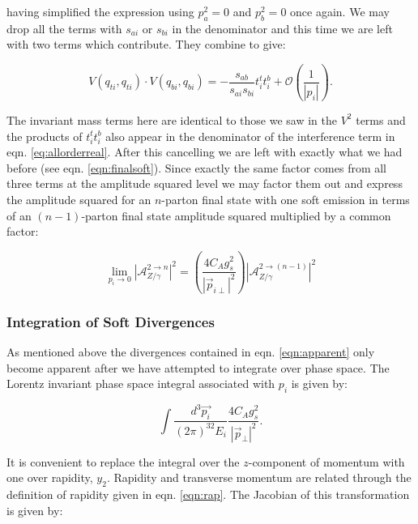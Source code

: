 			having simplified the expression using $p_a^2=0$ and $p_b^2=0$ once again.  We may
			drop all the terms with $s_{ai}$ or $s_{bi}$ in the denominator and this time we are
			left with two terms which contribute.  They combine to give:

			\begin{equation}
				V(q_{ti}, q_{ti})\cdot V(q_{bi}, q_{bi}) = -\frac{s_{ab}}{s_{ai}s_{bi}}t_i^tt_i^b +
					\mathcal{O}\left(\frac{1}{|p_i|}\right).
			\end{equation}

			The invariant mass terms here are identical to those we saw in the $V^2$ terms and the products of
			$t_i^tt_i^b$ also appear in the denominator of the interference term in eqn. \eqref{eq:allorderreal}.
			After this cancelling we are left with exactly what we had before (see eqn. \eqref{eqn:finalsoft}).
			Since exactly the same factor comes from all three terms at the amplitude squared level we may factor
			them out and express the amplitude squared for an $n$-parton final state with one soft emission in
			terms of an $(n-1)$-parton final state amplitude squared multiplied by a common factor:

			\begin{equation}
				\lim_{p_i\rightarrow0} |\mathcal{A}_{Z/\gamma}^{2\rightarrow n}|^2 = \left(\frac{4C_Ag_s^2}{|\vec{p}_{i\perp}|^2}\right)
					|\mathcal{A}_{Z/\gamma}^{2\rightarrow (n-1)}|^2
				\label{eqn:apparent}
			\end{equation}

		\subsubsection{Integration of Soft Divergences}
			\label{sub:subsection_name}

			As mentioned above the divergences contained in eqn. \eqref{eqn:apparent} only become
			apparent after we have attempted to integrate over phase space.  The Lorentz
			invariant phase space integral associated with $p_i$ is given by:

			\begin{equation}
				\int\frac{d^3\vec{p_i}}{(2\pi)^32E_i}\frac{4C_Ag_s^2}{|\vec{p}_\perp|^2}.
			\end{equation}

			It is convenient to replace the integral over the $z$-component of momentum with one over rapidity,
			$y_2$.  Rapidity and transverse momentum are related through the definition of rapidity given
			in eqn. \eqref{eqn:rap}.  The Jacobian of this transformation is given by:

